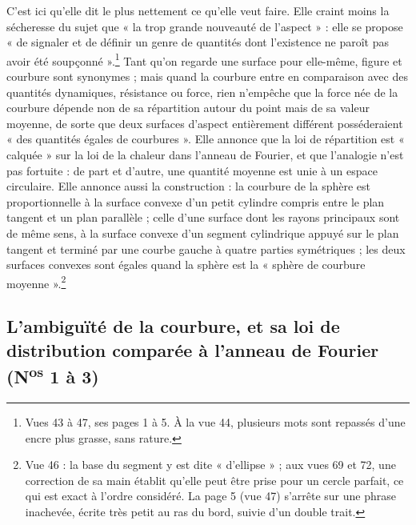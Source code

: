 \documentclass[11pt,a4paper]{article}
\begin{document}
C'est ici qu'elle dit le plus nettement ce qu'elle veut faire. Elle craint moins
la sécheresse du sujet que « la trop grande nouveauté de l'aspect » : elle se
propose « de signaler et de définir un genre de quantités dont l'existence ne
paroît pas avoir été soupçonné ».\footnote{Vues 43 à 47, ses pages 1 à 5. À la
vue 44, plusieurs mots sont repassés d'une encre plus grasse, sans rature.} Tant
qu'on regarde une surface pour elle-même, figure et courbure sont synonymes ;
mais quand la courbure entre en comparaison avec des quantités dynamiques,
résistance ou force, rien n'empêche que la force née de la courbure dépende non
de sa répartition autour du point mais de sa valeur moyenne, de sorte que deux
surfaces d'aspect entièrement différent posséderaient « des quantités égales
de courbures ». Elle annonce que la loi de répartition est « calquée » sur la
loi de la chaleur dans l'anneau de Fourier, et que l'analogie n'est pas
fortuite : de part et d'autre, une quantité moyenne est unie à un espace
circulaire. Elle annonce aussi la construction : la courbure de la sphère est
proportionnelle à la surface convexe d'un petit cylindre compris entre le plan
tangent et un plan parallèle ; celle d'une surface dont les rayons principaux
sont de même sens, à la surface convexe d'un segment cylindrique appuyé sur le
plan tangent et terminé par une courbe gauche à quatre parties symétriques ; les
deux surfaces convexes sont égales quand la sphère est la « sphère de courbure
moyenne ».\footnote{Vue 46 : la base du segment y est dite « d'ellipse » ; aux
vues 69 et 72, une correction de sa main établit qu'elle peut être prise pour un
cercle parfait, ce qui est exact à l'ordre considéré. La page 5 (vue 47) s'arrête
sur une phrase inachevée, écrite très petit au ras du bord, suivie d'un double
trait.}

\subsection*{L'ambiguïté de la courbure, et sa loi de distribution comparée à l'anneau de Fourier (N\textsuperscript{os} 1 à 3)}
\end{document}

